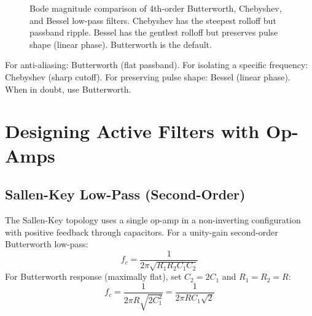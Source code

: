 \documentclass[11pt,letterpaper,twoside,openany]{book}
\begin{document}
\begin{figure}[htbp]
\centering
{}
\caption{Bode magnitude comparison of 4th-order Butterworth, Chebyshev, and Bessel low-pass filters. Chebyshev has the steepest rolloff but passband ripple. Bessel has the gentlest rolloff but preserves pulse shape (linear phase). Butterworth is the default.}
\label{fig:filter_compare}
\end{figure}

\begin{tipbox}
For anti-aliasing: Butterworth (flat passband). For isolating a specific frequency: Chebyshev (sharp cutoff). For preserving pulse shape: Bessel (linear phase). When in doubt, use Butterworth.
\end{tipbox}


\section{Designing Active Filters with Op-Amps}

\subsection{Sallen-Key Low-Pass (Second-Order)}
The Sallen-Key topology uses a single op-amp in a non-inverting configuration with positive feedback through capacitors. For a unity-gain second-order Butterworth low-pass:
\begin{equation}
f_c = \frac{1}{2\pi\sqrt{R_1 R_2 C_1 C_2}}
\end{equation}
For Butterworth response (maximally flat), set $C_2 = 2C_1$ and $R_1 = R_2 = R$:
\begin{equation}
f_c = \frac{1}{2\pi R \sqrt{2C_1^2}} = \frac{1}{2\pi R C_1 \sqrt{2}}
\end{equation}
\end{document}
